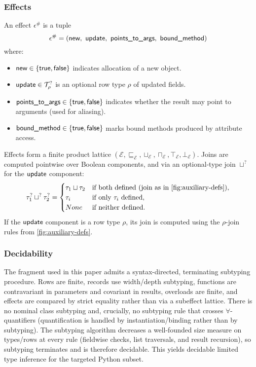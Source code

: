 \subsubsection*{Effects}
\label{sec:effects}
An effect $\epsilon^\#$ is a tuple
\[
\epsilon^\# = (\tnew,\ \tupdate,\ \tptstoargs,\ \tboundmeth)
\]
where:
\begin{itemize}
  \item $\textsf{new} \in \{\mathsf{true},\mathsf{false}\}$ indicates allocation of a new object.
  \item $\textsf{update} \in \mathcal{T}^?_{\rho}$ is an optional row type $\rho$ of updated fields.
  \item $\textsf{points\_to\_args} \in \{\mathsf{true},\mathsf{false}\}$ indicates whether the result may point to arguments (used for aliasing).
  \item $\textsf{bound\_method} \in \{\mathsf{true},\mathsf{false}\}$ marks bound methods produced by attribute access.
\end{itemize}

Effects form a finite product lattice $(\mathcal{E}, \sqsubseteq_{\mathcal{E}}, \sqcup_{\mathcal{E}}, \sqcap_{\mathcal{E}}, \top_{\mathcal{E}}, \bot_{\mathcal{E}})$.  
Joins are computed pointwise over Boolean components, and via an optional-type join $\sqcup^?$ for the $\textsf{update}$ component:
\[
\tau_1^? \sqcup^? \tau_2^? =
\begin{cases}
\tau_1 \sqcup \tau_2 & \text{if both defined (join as in \autoref{fig:auxiliary-defs})},\\
\tau_i & \text{if only $\tau_i$ defined},\\
None & \text{if neither defined}.
\end{cases}
\]
If the $\textsf{update}$ component is a row type $\rho$, its join is computed using the $\rho$-join rules from \autoref{fig:auxiliary-defs}.

\subsubsection*{Decidability}
The fragment used in this paper admits a syntax-directed, terminating subtyping procedure. Rows are finite, records use width/depth subtyping, functions are contravariant in parameters and covariant in results, overloads are finite, and effects are compared by strict equality rather than via a subeffect lattice. There is no nominal class subtyping and, crucially, no subtyping rule that crosses $\forall$-quantifiers (quantification is handled by instantiation/binding rather than by subtyping). The subtyping algorithm decreases a well-founded size measure on types/rows at every rule (fieldwise checks, list traversals, and result recursion), so subtyping terminates and is therefore decidable. This yields decidable limited type inference for the targeted Python subset. 

